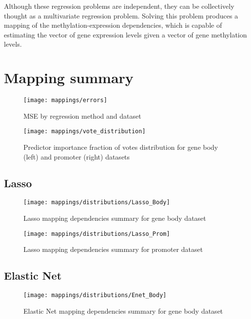 Although these regression problems are independent, they can be collectively thought as a multivariate regression problem. Solving this problem produces a mapping of the methylation-expression dependencies, which is capable of estimating the vector of gene expression levels given a vector of gene methylation levels. 

\pagebreak
\section{Mapping summary}


\begin{figure}[H]
	\centering
	\texttt{[image: mappings/errors]}
	\caption{MSE by regression method and dataset}
	\label{fig:map_errors}
\end{figure}

\pagebreak

\begin{figure}[H]
	\centering
	\texttt{[image: mappings/vote\_distribution]}
	\caption{Predictor importance fraction of votes distribution for gene body (left) and promoter (right) datasets}
	\label{fig:map_vote_dist}
\end{figure}


\pagebreak
\subsection{Lasso}

\begin{figure}[H]
	\centering
	\texttt{[image: mappings/distributions/Lasso\_Body]}
	\caption{Lasso mapping dependencies summary for gene body dataset}
	\label{fig:map_body_lasso}
\end{figure}

\begin{figure}[H]
	\centering
	\texttt{[image: mappings/distributions/Lasso\_Prom]}
	\caption{Lasso mapping dependencies summary for promoter dataset}
	\label{fig:map_prom_lasso}
\end{figure}


\pagebreak
\subsection{Elastic Net}

\begin{figure}[H]
	\centering
	\texttt{[image: mappings/distributions/Enet\_Body]}
	\caption{Elastic Net mapping dependencies summary for gene body dataset}
	\label{fig:map_body_enet}
\end{figure}

